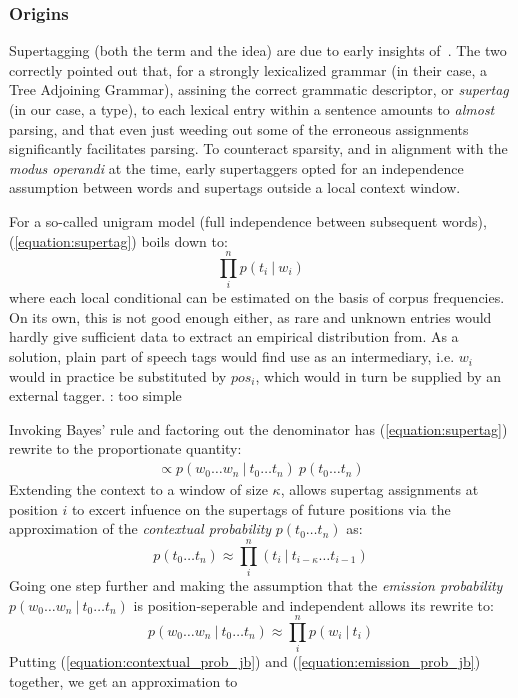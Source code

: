 \subsubsection{Origins}
Supertagging (both the term and the idea) are due to early insights of~\citet{joshi1994disambiguation}.
The two correctly pointed out that, for a strongly lexicalized grammar (in their case, a Tree Adjoining Grammar), assining the correct grammatic descriptor, or \textit{supertag} (in our case, a type), to each lexical entry within a sentence amounts to \textit{almost} parsing, and that even just weeding out some of the erroneous assignments significantly facilitates parsing.
To counteract sparsity, and in alignment with the \textit{modus operandi} at the time, early supertaggers opted for an independence assumption between words and supertags outside a local context window.

For a so-called unigram model (full independence between subsequent words), (\ref{equation:supertag}) boils down to:
\begin{equation}
\prod_i^n p(t_i \ | \ w_i)
\end{equation}
where each local conditional can be estimated on the basis of corpus frequencies.
On its own, this is not good enough either, as rare and unknown entries would hardly give sufficient data to extract an empirical distribution from.
As a solution, plain part of speech tags would find use as an intermediary, i.e. $w_i$ would in practice be substituted by $pos_i$, which would in turn be supplied by an external tagger.
\todo : too simple

Invoking Bayes' rule and factoring out the denominator has (\ref{equation:supertag}) rewrite to the proportionate quantity:
\begin{align}
\propto p(w_0\dots w_n \ | \ t_0\dots t_n)~ p(t_0\dots t_n)
\end{align}
Extending the context to a window of size $\kappa$, allows supertag assignments at position $i$ to excert infuence on the supertags of future positions via the approximation of the \textit{contextual probability} $p(t_0 \dots t_n)$ as:
\begin{equation}\label{equation:contextual_prob_jb}
p(t_0 \dots t_n) \approx \prod_i^n (t_i \ | \ t_{i-\kappa}\dots t_{i-1})
\end{equation}
Going one step further and making the assumption that the \textit{emission probability} $p(w_0\dots w_n \ | \ t_0\dots t_n)$ is position-seperable and independent allows its rewrite to:
\begin{equation}\label{equation:emission_prob_jb}
p(w_0\dots w_n \ | \ t_0\dots t_n) \approx \prod_i^n p(w_i \ | \ t_i)
\end{equation}
Putting (\ref{equation:contextual_prob_jb}) and (\ref{equation:emission_prob_jb}) together, we get an approximation to 

